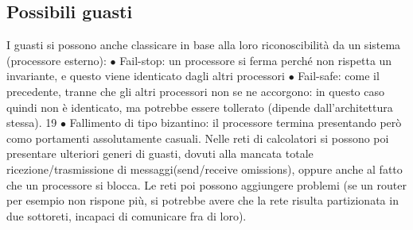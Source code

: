 \subsection{Possibili guasti}
I guasti si possono anche classicare in base alla loro riconoscibilità da un sistema
(processore esterno):
$\bullet$ Fail-stop: un processore si ferma perché non rispetta un invariante, e
questo viene identicato dagli altri processori
$\bullet$ Fail-safe: come il precedente, tranne che gli altri processori non se ne
accorgono: in questo caso quindi non è identicato, ma potrebbe essere
tollerato (dipende dall'architettura stessa).
19
$\bullet$ Fallimento di tipo bizantino: il processore termina presentando però como
portamenti assolutamente casuali.
Nelle reti di calcolatori si possono poi presentare ulteriori generi di guasti, dovuti
alla mancata totale ricezione/trasmissione di messaggi(send/receive omissions),
oppure anche al fatto che un processore si blocca. Le reti poi possono aggiungere
problemi (se un router per esempio non rispone più, si potrebbe avere che la
rete risulta partizionata in due sottoreti, incapaci di comunicare fra di loro).
